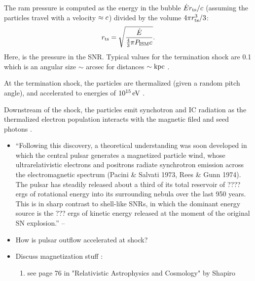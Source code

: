 The ram pressure is computed as the energy in the
bubble $\dot{E} r_\text{ts}/c$ (assuming the particles
travel with a velocity $\approx c$) divided by the volume
$4\pi r_\text{ts}^3/3$:
\begin{equation}
  r_\text{ts} = \sqrt{\frac{\dot{E}}{\tfrac{4}{3}\pi P_\text{ISM} c}}.
\end{equation}
Here, \pressureISM is the pressure in the SNR.
Typical values for the termination shock are 0.1\unitspace\parsec
which is an angular size $\sim$ \ac{arcsec} for distances $\sim\text{kpc}$
\citep{gaensler_2006_evolution-structure}.

At the termination shock, the particles are
thermalized (given a random pitch angle), and accelerated
to energies of $10^{15}\,\text{eV}$
\citep{arons_1996_pulsars-gamma-rays}.

Downstream of the shock, the particles emit synchotron and \ac{IC}
radiation as the thermalized electron population interacts with the
magnetic filed and seed photons \citep{gaensler_2006_evolution-structure}.




\begin{itemize}
  \item ``Following this discovery, a theoretical understanding was
  soon developed in which the central pulsar generates a magnetized
  particle wind, whose ultrarelativistic electrons and positrons radiate
  synchrotron emission across the electromagnetic spectrum (Pacini \&
  Salvati 1973, Rees \& Gunn 1974). The pulsar has steadily released
  about a third of its total reservoir of ???? ergs
  of rotational energy into its surrounding nebula over the last 950
  years. This is in sharp contrast to shell-like SNRs, in which the
  dominant energy source is the ??? ergs of kinetic energy
  released at the moment of the original SN explosion.''  -- \cite{gaensler_2006_evolution-structure}
  \item How is pulsar outflow accelerated at shock?
  \item Discuss magnetization stuff :
    \begin{enumerate}
      \item see page 76 in "Relativistic Astrophysics and Cosmology" by Shapiro
    \end{enumerate}
\end{itemize}


